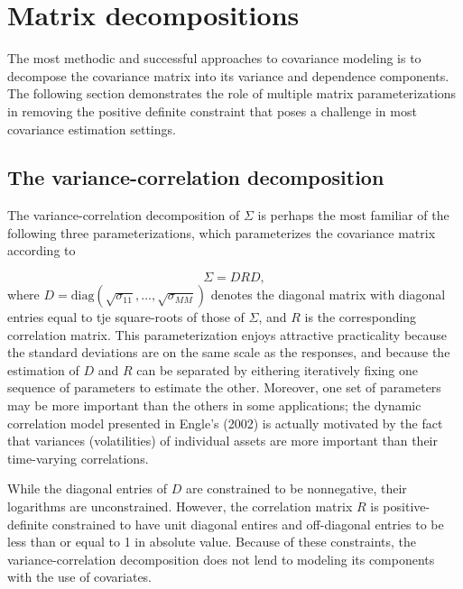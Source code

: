 
\section{Matrix decompositions} \label{chapter-1-matrix-decompositions}
The most methodic and successful approaches to covariance modeling is to decompose the covariance matrix into its variance and dependence components. The following section demonstrates the role of multiple matrix parameterizations in removing the positive definite constraint that poses a challenge in most covariance estimation settings.

\subsection{The variance-correlation decomposition}

The variance-correlation decomposition of $\Sigma$ is perhaps the most familiar of the following three parameterizations, which parameterizes the covariance matrix according to

\begin{equation}\label{eq:variance-correlation-decomposition}
\Sigma = DRD,
\end{equation}
\noindent
where $D = \mbox{diag}\left(\sqrt{\sigma_{11}},\dots , \sqrt{\sigma_{MM}}\right)$ denotes the diagonal matrix with diagonal entries equal to tje square-roots of those of $\Sigma$, and $R$ is the corresponding correlation matrix. This parameterization enjoys attractive practicality because the standard deviations are on the same scale as the responses, and because the estimation of $D$ and $R$ can be separated by eithering iteratively fixing one sequence of parameters to estimate the other. Moreover, one set of parameters may be more important than the others in some applications; the dynamic correlation model presented in  Engle’s (2002) is actually motivated by the fact that variances (volatilities) of individual assets are more important than their time-varying correlations.
\bigskip

While the diagonal entries of $D$ are constrained to be nonnegative, their logarithms are unconstrained. However, the correlation matrix $R$ is positive-definite constrained to have unit diagonal entires and off-diagonal entries to be less than or equal to 1 in absolute value. Because of these constraints, the variance-correlation decomposition does not lend to modeling its components with the use of covariates.


